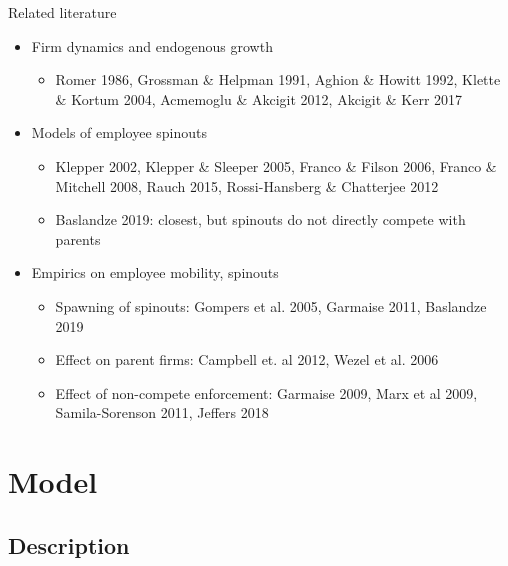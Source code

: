 \documentclass[english,usenames,dvipsnames]{beamer}
\begin{document}
\begin{frame}{Related literature}
\begin{itemize}
	\item Firm dynamics and endogenous growth
	\begin{itemize}
		\item Romer 1986, Grossman \& Helpman 1991, Aghion \& Howitt 1992, Klette \& Kortum 2004, Acmemoglu \& Akcigit 2012, Akcigit \& Kerr 2017
	\end{itemize}
	\item Models of employee spinouts
	\begin{itemize}
		\item Klepper 2002, Klepper \& Sleeper 2005, Franco \& Filson 2006, Franco \& Mitchell 2008, Rauch 2015, Rossi-Hansberg \& Chatterjee 2012
		\item Baslandze 2019: closest, but spinouts \alert{do not directly compete} with parents
	\end{itemize}
	\item Empirics on employee mobility, spinouts
	\begin{itemize}
		\item Spawning of spinouts: Gompers et al. 2005, Garmaise 2011, Baslandze 2019
		\item Effect on parent firms: Campbell et. al 2012, Wezel et al. 2006
		\item Effect of non-compete enforcement: Garmaise 2009, Marx et al 2009, Samila-Sorenson 2011, Jeffers 2018
	\end{itemize}
\end{itemize}
\end{frame}


\section{Model}

\subsection{Description}
\end{document}

